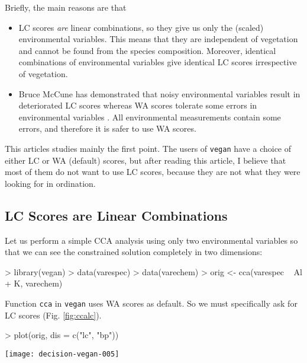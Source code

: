 \documentclass[a4paper,10pt]{amsart}
\begin{document}
Briefly, the main reasons are that
\begin{itemize}
\item
LC scores \emph{are} linear combinations, so they give us only the
(scaled) environmental variables. This means that they are
independent of vegetation and cannot be found from the species
composition.  Moreover, identical combinations of environmental
variables give identical LC scores irrespective of vegetation.
\item
Bruce McCune has demonstrated that noisy environmental variables
result in deteriorated LC scores whereas WA scores tolerate some errors
in environmental variables \cite{McCune97}.  All environmental
measurements contain some errors, and therefore it is safer to use WA
scores.
\end{itemize}
This articles studies mainly the first point.  The users of
\texttt{vegan} have a choice of either LC or WA (default) scores, but
after reading this article, I believe that most of them do not want to
use LC scores, because they are not what they were looking for in
ordination.

\subsection{LC Scores are Linear Combinations}

Let us perform a simple CCA analysis using only two environmental
variables so that we can see the constrained solution completely in
two dimensions:
\begin{Schunk}
\begin{Sinput}
> library(vegan)
> data(varespec)
> data(varechem)
> orig <- cca(varespec ~ Al + K, varechem)
\end{Sinput}
\end{Schunk}
Function \texttt{cca} in \texttt{vegan} uses WA scores as
default. So we must specifically ask for LC scores
(Fig. \ref{fig:ccalc}).
\begin{Schunk}
\begin{Sinput}
> plot(orig, dis = c("lc", "bp"))
\end{Sinput}
\end{Schunk}
\begin{SCfigure}
\texttt{[image: decision-vegan-005]}
\caption{LC scores in CCA of the original data.}
\label{fig:ccalc}
\end{SCfigure}
\end{document}

